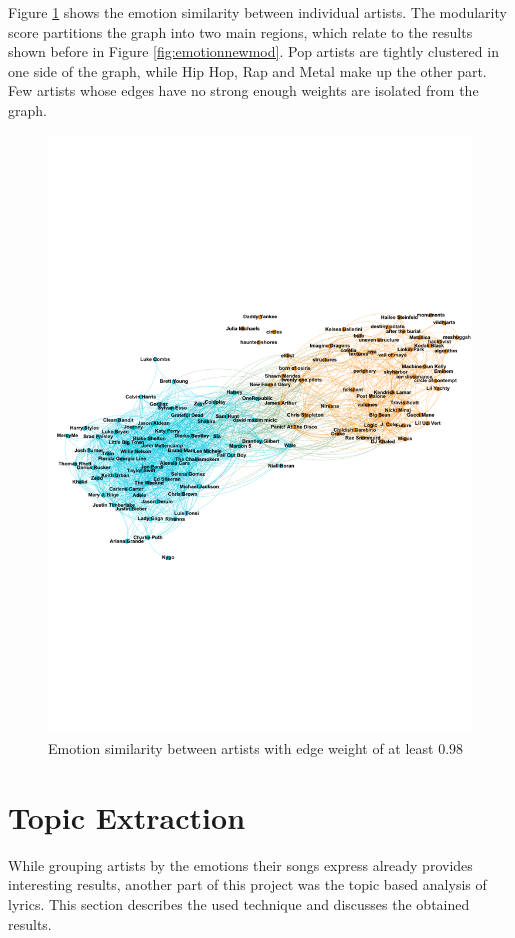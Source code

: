 \documentclass[10pt,a4paper]{article}
\begin{document}
		Figure \ref{fig:emotionsimilarity} shows the emotion similarity between individual artists. The modularity score partitions the graph into two main regions, which relate to the results shown before in Figure \ref{fig:emotionnewmod}. Pop artists are tightly clustered in one side of the graph, while Hip Hop, Rap and Metal make up the other part. Few artists whose edges have no strong enough weights are isolated from the graph.
		
		\begin{figure}[htb]
			\centering
			\includegraphics[trim=0mm 80mm 0mm 85mm, clip, width=0.8\linewidth]{data/emotion_similarity}
			\caption{Emotion similarity between artists with edge weight of at least $0.98$}
			\label{fig:emotionsimilarity}
		\end{figure}
	
	\section{Topic Extraction}
	\label{sec:topicextraction}
	While grouping artists by the emotions their songs express already provides interesting results, another part of this project was the topic based analysis of lyrics. This section describes the used technique and discusses the obtained results.
	
\end{document}
